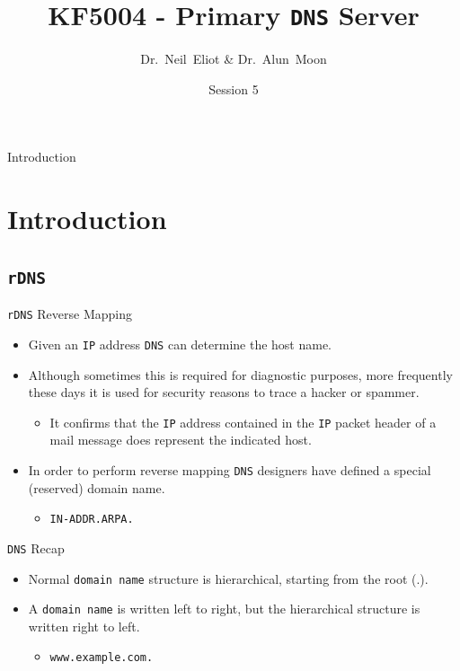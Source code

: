 \documentclass[xcolor=table]{beamer}
\title{KF5004 - Primary \texttt{DNS} Server}
\author{Dr.~Neil~Eliot \& Dr.~Alun~Moon}
\institute[Northumbria University] %
{
  Department of Computer and Information Sciences\\
  University of Northumbria
}
\date{Session 5}
\begin{document}
\begin{frame}
  \titlepage
\end{frame}

\begin{frame}{Introduction}
  \tableofcontents
\end{frame}


\section{Introduction}
\subsection{\texttt{rDNS}}
\begin{frame}{\texttt{rDNS} Reverse Mapping}
  \begin{itemize}
    \item Given an \texttt{IP} address \texttt{DNS} can determine the host name.
    \item Although sometimes this is required for diagnostic purposes, more frequently these days it is used for security reasons to trace a hacker or spammer.
      \begin{itemize}
        \item It confirms that the \texttt{IP} address contained in the \texttt{IP} packet header of a mail message does represent the indicated host.
      \end{itemize}
    \item In order to perform reverse mapping \texttt{DNS} designers have defined a special (reserved) domain name.
    \begin{itemize}
      \item \texttt{IN-ADDR.ARPA.}
    \end{itemize}
\end{itemize}
\end{frame}

\begin{frame}{\texttt{DNS} Recap}
  \begin{itemize}
    \item Normal \texttt{domain name} structure is hierarchical, starting from the root (.).
    \item A \texttt{domain name} is written left to right, but the hierarchical structure is written right to left.
      \begin{itemize}
        \item \texttt{www.example.com.}
      \end{itemize}
  \end{itemize}
\end{frame}
\end{document}
